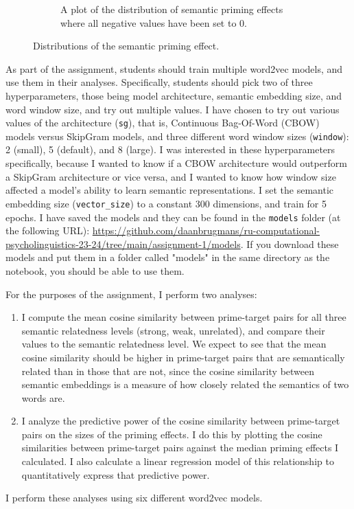 \documentclass{IEEEtran}
\begin{document}
\begin{figure}
\begin{subfigure}{0.4\textwidth}
        \caption{A plot of the distribution of semantic priming effects where all negative values have been set to 0.}
        \label{fig:semantic_priming_normalized}
    \end{subfigure}
    \caption{Distributions of the semantic priming effect.}
\end{figure}

As part of the assignment, students should train multiple word2vec models, and use them in their analyses.
Specifically, students should pick two of three hyperparameters, those being model architecture, semantic embedding size, and word window size, and try out multiple values.
I have chosen to try out various values of the architecture (\texttt{sg}), that is, Continuous Bag-Of-Word (CBOW) models versus SkipGram models, and three different word window sizes (\texttt{window}): 2 (small), 5 (default), and 8 (large).
I was interested in these hyperparameters specifically, because I wanted to know if a CBOW architecture would outperform a SkipGram architecture or vice versa, and I wanted to know how window size affected a model's ability to learn semantic representations.
I set the semantic embedding size (\texttt{vector\_size}) to a constant 300 dimensions, and train for 5 epochs.
I have saved the models and they can be found in the \texttt{models} folder (at the following URL): \url{https://github.com/daanbrugmans/ru-computational-psycholinguistics-23-24/tree/main/assignment-1/models}.
If you download these models and put them in a folder called "models" in the same directory as the notebook, you should be able to use them.

For the purposes of the assignment, I perform two analyses:
\begin{enumerate}
    \item I compute the mean cosine similarity between prime-target pairs for all three semantic relatedness levels (strong, weak, unrelated), and compare their values to the semantic relatedness level.
    We expect to see that the mean cosine similarity should be higher in prime-target pairs that are semantically related than in those that are not, since the cosine similarity between semantic embeddings is a measure of how closely related the semantics of two words are.
    \item I analyze the predictive power of the cosine similarity between prime-target pairs on the sizes of the priming effects.
    I do this by plotting the cosine similarities between prime-target pairs against the median priming effects I calculated.
    I also calculate a linear regression model of this relationship to quantitatively express that predictive power.    
\end{enumerate} 
I perform these analyses using six different word2vec models.
\end{document}
